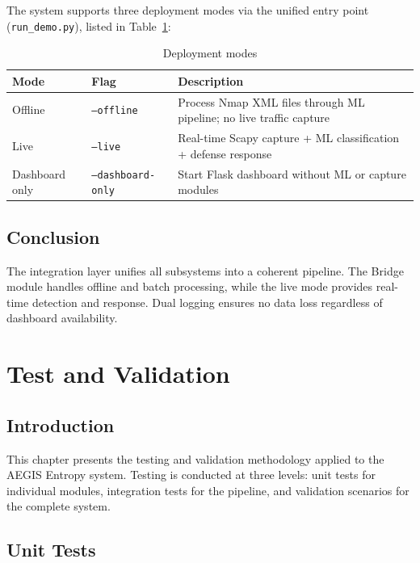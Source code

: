 \documentclass[12pt,a4paper]{report}
\begin{document}
The system supports three deployment modes via the unified entry point (\texttt{run\_demo.py}), listed in Table~\ref{tab:deploy_modes}:

\begin{table}[H]
\centering
\caption{Deployment modes}
\label{tab:deploy_modes}
\begin{tabular}{llp{6cm}}
\toprule
\textbf{Mode} & \textbf{Flag} & \textbf{Description} \\
\midrule
Offline & \texttt{--offline} & Process Nmap XML files through ML pipeline; no live traffic capture \\
Live & \texttt{--live} & Real-time Scapy capture + ML classification + defense response \\
Dashboard only & \texttt{--dashboard-only} & Start Flask dashboard without ML or capture modules \\
\bottomrule
\end{tabular}
\end{table}

\section{Conclusion}

The integration layer unifies all subsystems into a coherent pipeline. The Bridge module handles offline and batch processing, while the live mode provides real-time detection and response. Dual logging ensures no data loss regardless of dashboard availability.

\chapter{Test and Validation}\label{ch:test_validation}

\section{Introduction}

This chapter presents the testing and validation methodology applied to the AEGIS Entropy system. Testing is conducted at three levels: unit tests for individual modules, integration tests for the pipeline, and validation scenarios for the complete system.

\section{Unit Tests}
\end{document}
